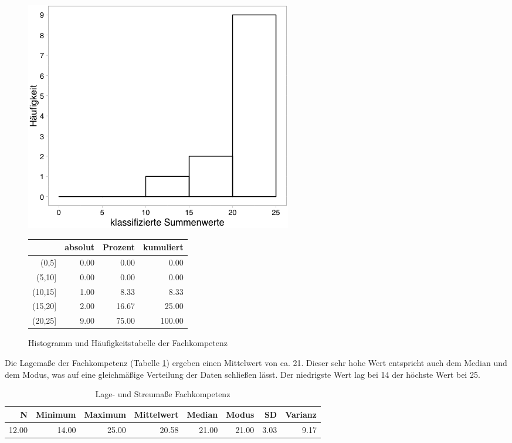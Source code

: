 \documentclass[12pt,smallheadings, bibliography=totoc]{scrartcl}
\begin{document}
\begin{figure}[H]

\begin{minipage}{.4\linewidth}
\includegraphics[width=0.8\linewidth]{Anhang/FKHistnn.png}

\end{minipage}
\begin{minipage}{.4\linewidth}
\centering
\raisebox{\depth}
{\begin{tabular}{rrrr}
  \hline
 & absolut & Prozent & kumuliert \\
  \hline
(0,5] & 0.00 & 0.00 & 0.00 \\
  (5,10] & 0.00 & 0.00 & 0.00 \\
  (10,15] & 1.00 & 8.33 & 8.33 \\
  (15,20] & 2.00 & 16.67 & 25.00 \\
  (20,25] & 9.00 & 75.00 & 100.00 \\
   \hline
\end{tabular}

}
\end{minipage}
\caption{Histogramm und Häufigkeitstabelle der Fachkompetenz}
\label{FK}
\end{figure}

Die Lagemaße der Fachkompetenz (Tabelle \ref{tab:lFK}) ergeben einen
Mittelwert von ca. 21. Dieser sehr hohe Wert entspricht auch dem Median
und dem Modus, was auf eine gleichmäßige Verteilung der Daten schließen
lässt. Der niedrigste Wert lag bei 14 der höchste Wert bei 25.

\begin{table}[H]
\centering
\caption{Lage- und Streumaße Fachkompetenz}
\label{tab:lFK}
\begin{tabular}{rrrrrrrr}
  \hline
  N & Minimum & Maximum & Mittelwert & Median & Modus & SD & Varianz \\
  \hline
 12.00 & 14.00 & 25.00 & 20.58 & 21.00 & 21.00 & 3.03 & 9.17 \\
   \hline
\end{tabular}
\end{table}
\end{document}
